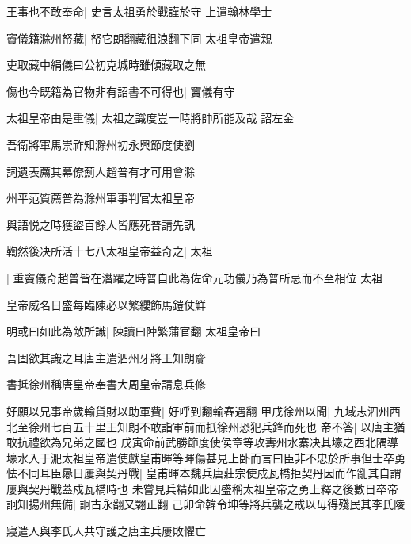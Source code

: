 王事也不敢奉命|{
	史言太祖勇於戰謹於守}
上遣翰林學士

竇儀籍滁州帑藏|{
	帑它朗翻藏徂浪翻下同}
太祖皇帝遣親

吏取藏中絹儀曰公初克城時雖傾藏取之無

傷也今既籍為官物非有詔書不可得也|{
	竇儀有守}


太祖皇帝由是重儀|{
	太祖之識度豈一時將帥所能及哉}
詔左金

吾衛將軍馬崇祚知滁州初永興節度使劉

詞遺表薦其幕僚薊人趙普有才可用會滁

州平范質薦普為滁州軍事判官太祖皇帝

與語悦之時獲盜百餘人皆應死普請先訊

鞫然後决所活十七八太祖皇帝益奇之|{
	太祖}


|{
	重竇儀奇趙普皆在潛躍之時普自此為佐命元功儀乃為普所忌而不至相位}
太祖

皇帝威名日盛每臨陳必以繁纓飾馬鎧仗鮮

明或曰如此為敵所識|{
	陳讀曰陣繁蒲官翻}
太祖皇帝曰

吾固欲其識之耳唐主遣泗州牙將王知朗齎

書抵徐州稱唐皇帝奉書大周皇帝請息兵修

好願以兄事帝歲輸貨財以助軍費|{
	好呼到翻輸舂遇翻}
甲戌徐州以聞|{
	九域志泗州西北至徐州七百五十里王知朗不敢詣軍前而扺徐州恐犯兵鋒而死也}
帝不答|{
	以唐主猶敢抗禮欲為兄弟之國也}
戊寅命前武勝節度使侯章等攻夀州水寨决其壕之西北隅導壕水入于淝太祖皇帝遣使獻皇甫暉等暉傷甚見上卧而言曰臣非不忠於所事但士卒勇怯不同耳臣曏日屢與契丹戰|{
	皇甫暉本魏兵唐莊宗使戍瓦橋拒契丹因而作亂其自謂屢與契丹戰蓋戍瓦橋時也}
未嘗見兵精如此因盛稱太祖皇帝之勇上釋之後數日卒帝詗知揚州無備|{
	詗古永翻又翾正翻}
己卯命韓令坤等將兵襲之戒以毋得殘民其李氏陵

寢遣人與李氏人共守護之唐主兵屢敗懼亡

